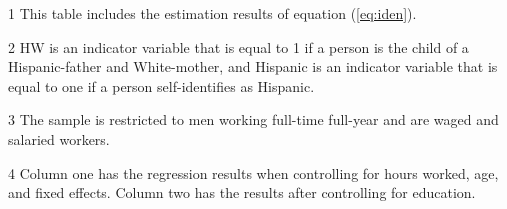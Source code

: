 \begin{table}[H]
\begin{threeparttable}
\begin{tablenotes}
\item[1] \footnotesize{This table includes the estimation results of equation (\ref{eq:iden}).}
\item[2] \footnotesize{HW is an indicator variable that is equal to 1 if a person is the child of a Hispanic-father and White-mother, and Hispanic is an indicator variable that is equal to one if a person self-identifies as Hispanic.}
\item[3] \footnotesize{The sample is restricted to men working full-time full-year and are waged and salaried workers.}
\item[4] \footnotesize{Column one has the regression results when controlling for hours worked, age, and fixed effects. Column two has the results after controlling for education.}
\end{tablenotes}
\end{threeparttable}
\end{table}
